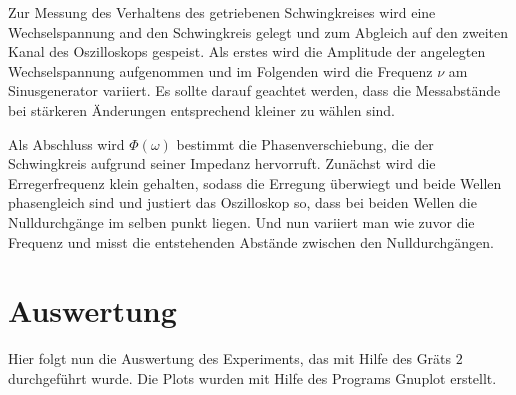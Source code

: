     Zur Messung des Verhaltens des getriebenen Schwingkreises wird eine Wechselspannung and den Schwingkreis gelegt
    und zum Abgleich auf den zweiten Kanal des Oszilloskops gespeist.
    Als erstes wird die Amplitude der angelegten Wechselspannung aufgenommen
    und im Folgenden wird die Frequenz $\nu$ am Sinusgenerator variiert.
    Es sollte darauf geachtet werden, dass die Messabstände bei stärkeren Änderungen entsprechend kleiner zu wählen sind.

    Als Abschluss wird $\Phi(\omega)$ bestimmt die Phasenverschiebung, die der Schwingkreis aufgrund seiner Impedanz hervorruft.
    Zunächst wird die Erregerfrequenz klein gehalten, sodass die Erregung überwiegt und beide Wellen phasengleich sind
    und justiert das Oszilloskop so, dass bei beiden Wellen die Nulldurchgänge im selben punkt liegen.
    Und nun variiert man wie zuvor die Frequenz und misst die entstehenden Abstände zwischen den Nulldurchgängen.

    \section{Auswertung}
    \label{sec:Auswertung}
    Hier folgt nun die Auswertung des Experiments, das mit Hilfe des Gräts $2$ durchgeführt wurde.
    Die Plots wurden mit Hilfe des Programs Gnuplot erstellt.
